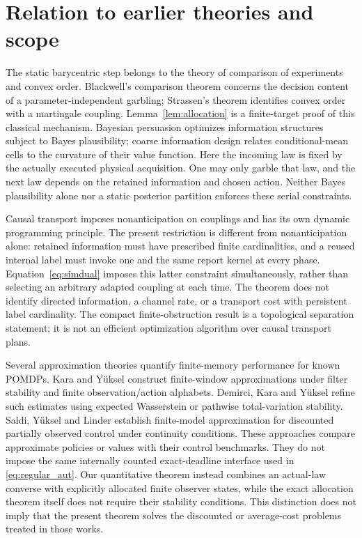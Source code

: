 \section{Relation to earlier theories and scope}\label{sec:literature}
The static barycentric step belongs to the theory of comparison of experiments and convex order. Blackwell's comparison theorem\cite{blackwell} concerns the decision content of a parameter-independent garbling; Strassen's theorem\cite{strassen} identifies convex order with a martingale coupling. Lemma~\ref{lem:allocation} is a finite-target proof of this classical mechanism. Bayesian persuasion\cite{kamenica} optimizes information structures subject to Bayes plausibility; coarse information design\cite{lyu} relates conditional-mean cells to the curvature of their value function. Here the incoming law is fixed by the actually executed physical acquisition. One may only garble that law, and the next law depends on the retained information and chosen action. Neither Bayes plausibility alone nor a static posterior partition enforces these serial constraints.

Causal transport\cite{backhoff} imposes nonanticipation on couplings and has its own dynamic programming principle. The present restriction is different from nonanticipation alone: retained information must have prescribed finite cardinalities, and a reused internal label must invoke one and the same report kernel at every phase. Equation~\eqref{eq:simdual} imposes this latter constraint simultaneously, rather than selecting an arbitrary adapted coupling at each time. The theorem does not identify directed information, a channel rate, or a transport cost with persistent label cardinality. The compact finite-obstruction result is a topological separation statement; it is not an efficient optimization algorithm over causal transport plans.

Several approximation theories quantify finite-memory performance for known POMDPs. Kara and Y\"uksel\cite{kara} construct finite-window approximations under filter stability and finite observation/action alphabets. Demirci, Kara and Y\"uksel\cite{refined} refine such estimates using expected Wasserstein or pathwise total-variation stability. Saldi, Y\"uksel and Linder\cite{saldi} establish finite-model approximation for discounted partially observed control under continuity conditions. These approaches compare approximate policies or values with their control benchmarks. They do not impose the same internally counted exact-deadline interface used in \eqref{eq:regular_aut}. Our quantitative theorem instead combines an actual-law converse with explicitly allocated finite observer states, while the exact allocation theorem itself does not require their stability conditions. This distinction does not imply that the present theorem solves the discounted or average-cost problems treated in those works.

